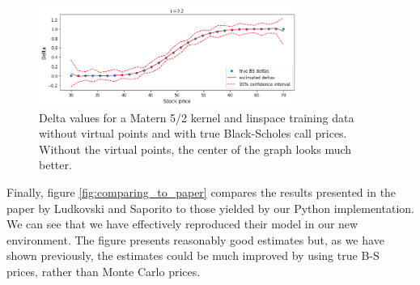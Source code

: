\documentclass[a4paper,12pt]{article}
\begin{document}
\begin{figure} [H]
    \centering
    \includegraphics[width=0.75\textwidth]{linspace_true_prices_no_virtual_BS_t=0.2.png}
    \caption{Delta values for a Matern 5/2 kernel and linspace training data without virtual points and with true Black-Scholes call prices. Without the virtual points, the center of the graph looks much better.}
    \label{fig:linspace_no_virtual}
\end{figure}
\noindent Finally, figure \ref{fig:comparing_to_paper} compares the results presented in the paper by Ludkovski and Saporito to those yielded by our Python implementation. We can see that we have effectively reproduced their model in our new environment. The figure presents reasonably good estimates but, as we have shown previously, the estimates could be much improved by using true B-S prices, rather than Monte Carlo prices.\\
\end{document}
